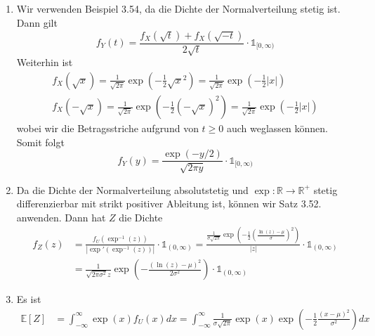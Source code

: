 \documentclass{article}
\def\to{\ensuremath{\rightarrow}} %
\def\R{\ensuremath{\mathbb{R}}}
\begin{document}
\subsection{}

\begin{enumerate}[label=(\alph*)]
	\item Wir verwenden Beispiel 3.54, da die Dichte der Normalverteilung stetig ist. Dann gilt
	      \begin{equation*}
		      f_{Y}(t) = \frac{f_X(\sqrt{t}) + f_X(\sqrt{-t})}{2 \sqrt{t}} \cdot \mathds{1}_{[0, \infty)}
	      \end{equation*}
	      Weiterhin ist
	      \begin{align*}
		      f_X(\sqrt{x}) = \frac{1}{\sqrt{2 \pi}} \exp\left(- \frac{1}{2}\sqrt{x}^2\right) = \frac{1}{\sqrt{2 \pi}} \exp\left(- \frac{1}{2} |x|\right) \\
		      f_X(-\sqrt{x}) = \frac{1}{\sqrt{2 \pi}} \exp\left(- \frac{1}{2}(-\sqrt{x})^2\right) = \frac{1}{\sqrt{2 \pi}} \exp\left(- \frac{1}{2} |x|\right)
	      \end{align*}
	      wobei wir die Betragsstriche aufgrund von $t \geq 0$ auch weglassen können. Somit folgt
	      \begin{equation*}
		      f_{Y}(y) = \frac{\exp\left(- y / 2\right)}{\sqrt{2 \pi y}} \cdot \mathds{1}_{[0, \infty)}
	      \end{equation*}
	\item Da die Dichte der Normalverteilung absolutstetig und $\exp: \R \to \R^+$ stetig differenzierbar mit strikt positiver Ableitung ist, können wir Satz 3.52. anwenden. Dann hat $Z$ die Dichte
	      \begin{align*}
		      f_Z(z) & = \frac{f_U(\exp^{-1}(z))}{|\exp'(\exp^{-1}(z))|} \cdot \mathds{1}_{(0, \infty)} = \frac{\frac{1}{\sigma \sqrt{2 \pi}} \exp\left(-\frac{1}{2} \left(\frac{\ln(z) - \mu}{\sigma}\right)^2\right)}{|z|} \cdot \mathds{1}_{(0, \infty)} \\
		             & = \frac{1}{ \sqrt{2 \pi \sigma^2} z} \exp\left( -\frac{(\ln(z) - \mu)^2}{2\sigma^2}\right)\cdot \mathds{1}_{(0, \infty)}
	      \end{align*}
	\item Es ist
	      \begin{align*}
		      \mathds{E}[Z] & = \int_{-\infty}^{\infty} \exp(x) f_U(x) dx = \int_{-\infty}^{\infty} \frac{1}{\sigma \sqrt{2 \pi}} \exp(x) \exp\left(- \frac{1}{2} \frac{(x - \mu)^2}{\sigma^2}\right) dx
	      \end{align*}

\end{enumerate}
\end{document}
